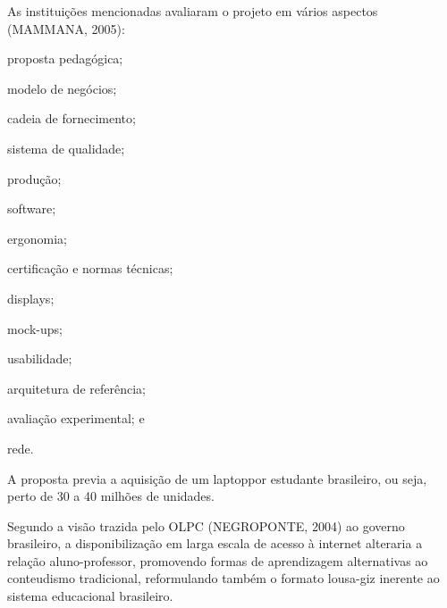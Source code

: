 \documentclass[
12pt,		%
openright,	%
twoside,  %
a4paper,			%
chapter=TITLE,		%
english,			%
french,				%
spanish,			%
brazil				%
]{USPSC-classe/USPSC}
\begin{document}
\noindent\begin{center}\mbox{\centering{}}\end{center}


As institui\c{c}\~oes mencionadas avaliaram o projeto em v\'arios aspectos  (MAMMANA, 2005):


















\begin{alineas}
\item proposta pedag\'ogica;
\item modelo de neg\'ocios;
\item cadeia de fornecimento;
\item sistema de qualidade;
\item produ\c{c}\~ao;
\item software;
\item ergonomia;
\item certifica\c{c}\~ao e normas t\'ecnicas;
\item displays;
\item mock-ups;
\item usabilidade;
\item arquitetura de refer\^encia;
\item avalia\c{c}\~ao experimental; e
\item rede.
\end{alineas}

A proposta previa a aquisi\c{c}\~ao de um \textquotedbl laptop\textquotedbl  por estudante brasileiro, ou seja, perto de 30 a 40 milh\~oes de unidades.

















Segundo a vis\~ao trazida pelo OLPC  (NEGROPONTE, 2004) ao governo brasileiro, a disponibiliza\c{c}\~ao em larga escala de acesso \`a internet alteraria a rela\c{c}\~ao aluno-professor, promovendo formas de aprendizagem alternativas ao conteudismo tradicional, reformulando tamb\'em o formato lousa-giz inerente ao sistema educacional brasileiro.
\end{document}
